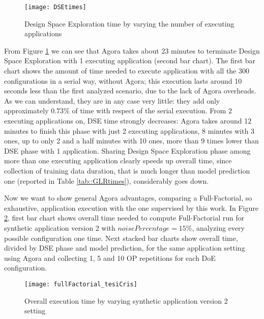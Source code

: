 \begin{figure}[htb]

    \centering
    \texttt{[image: DSEtimes]}
    \caption{Design Space Exploration time by varying the number of executing applications}
    \label{fig::DSEtimes}
    
\end{figure}

From Figure \ref{fig::DSEtimes} we can see that Agora takes about 23 minutes to terminate Design Space Exploration with 1 executing application (second bar chart). The first bar chart shows the amount of time needed to execute application with all the 300 configurations in a serial way, without Agora; this execution lasts around 10 seconds less than the first analyzed scenario, due to the lack of Agora overheads. As we can understand, they are in any case very little: they add only approximately $0.73\%$ of time with respect of the serial execution. From 2 executing applications on, DSE time strongly decreases: Agora takes around 12 minutes to finish this phase with just 2 executing applications, 8 minutes with 3 ones, up to only 2 and a half minutes with 10 ones, more than 9 times lower than DSE phase with 1 application. Sharing Design Space Exploration phase among more than one executing application clearly speeds up overall time, since collection of training data duration, that is much longer than model prediction one (reported in Table \ref{tab::GLRtimes}), considerably goes down.

Now we want to show general Agora advantages, comparing a Full-Factorial, so exhaustive, application execution with the one supervised by this work. In Figure \ref{fig::full_cris}, first bar chart shows overall time needed to compute Full-Factorial run for synthetic application version 2 with $noisePercentage = 15\%$, analyzing every possible configuration one time. Next stacked bar charts show overall time, divided by DSE phase and model prediction, for the same application setting using Agora and collecting 1, 5 and 10 OP repetitions for each DoE configuration.

\begin{figure}[htb]

    \centering
    \texttt{[image: fullFactorial\_tesiCris]}
    \caption{Overall execution time by varying synthetic application version 2 setting}
    \label{fig::full_cris}
    
\end{figure}

